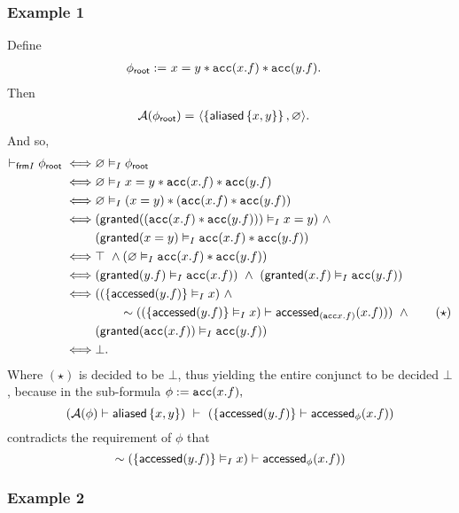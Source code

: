 \subsubsection*{Example 1}

Define
\begin{align*}
{\phi_\textsf{root}} := & \ x = y \ast \texttt{acc}(x.f) \ast \texttt{acc}(y.f).
\end{align*}
Then
\begin{align*}
\mathcal{A}({\phi_\textsf{root}}) = & \ \langle  \left\{ \textsf{aliased}\left\{ x,y \right\} \right\} ,  \varnothing  \rangle.
\end{align*}
And so,
\begin{align*}
\vdash_{\textsf{frm}I} {\phi_\textsf{root}}
\iff &
\varnothing \vDash_I {\phi_\textsf{root}}
\\ \iff &
\varnothing \vDash_I x = y \ast \texttt{acc}(x.f) \ast \texttt{acc}(y.f)
\\ \iff &
\varnothing \vDash_I (x = y) \ast (\texttt{acc}(x.f) \ast \texttt{acc}(y.f))
\\ \iff &
(\textsf{granted}((\texttt{acc}(x.f) \ast \texttt{acc}(y.f))) \vDash_I x = y) \ \land \\ &
(\textsf{granted}(x = y) \vDash_I \texttt{acc}(x.f) \ast \texttt{acc}(y.f))
\\ \iff &
\top \ \land (\varnothing \vDash_I \texttt{acc}(x.f) \ast \texttt{acc}(y.f))
\\ \iff &
(\textsf{granted}(y.f) \vDash_I \texttt{acc}(x.f)) \ \land \
(\textsf{granted}(x.f) \vDash_I \texttt{acc}(y.f))
\\ \iff &
(
  (\left\{  \textsf{accessed}(y.f)  \right\} \vDash_I x) \ \land \\ & \hspace{2em}
  \sim ((\left\{  \textsf{accessed}(y.f)  \right\} \vDash_I x) \vdash \textsf{accessed}_{(\texttt{acc}{x.f})}(x.f))
)
\ \land \tag{$\star$} \\ &
(\textsf{granted}(\texttt{acc}(x.f)) \vDash_I \texttt{acc}(y.f))
\\ \iff &
\bot.
\end{align*}
Where $(\star)$ is decided to be $\bot$, thus yielding the entire conjunct to be decided $\bot$, because in the sub-formula $\phi := \texttt{acc}(x.f),$
$$
  (\mathcal{A}(\phi) \vdash \textsf{aliased}\left\{ x,y \right\}) \ \vdash \
  (\left\{  \textsf{accessed}(y.f)  \right\} \vdash \textsf{accessed}_{\phi}(x.f))
$$
contradicts the requirement of $\phi$ that
$$
  \sim (\left\{  \textsf{accessed}(y.f)  \right\} \vDash_I x) \vdash \textsf{accessed}_\phi(x.f))
$$

\subsubsection*{Example 2}

